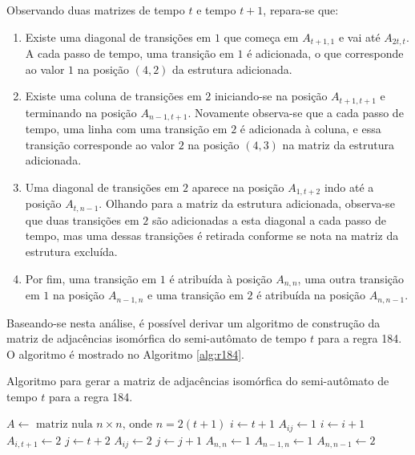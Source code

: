 \documentclass[12pt,a4paper]{article}
\begin{document}
Observando duas matrizes de tempo $t$ e tempo $t+1$, repara-se que:

\begin{enumerate}
\item Existe uma diagonal de transições em $1$ que começa em $A_{t+1,1}$
e vai até $A_{2t,t}$. A cada passo de tempo, uma transição em $1$ é adicionada,
o que corresponde ao valor $1$ na posição $(4,2)$ da estrutura adicionada.

\item Existe uma coluna de transições em $2$ iniciando-se na posição
$A_{t+1,t+1}$ e terminando na posição $A_{n-1,t+1}$. Novamente observa-se
que a cada passo de tempo, uma linha com uma transição em $2$ é adicionada à
coluna, e essa transição corresponde ao valor $2$ na posição $(4,3)$ na matriz da
estrutura adicionada.

\item Uma diagonal de transições em $2$ aparece na posição $A_{1,t+2}$ indo
até a posição $A_{t,n-1}$. Olhando para a matriz da estrutura adicionada,
observa-se que duas transições em $2$ são adicionadas a esta diagonal a cada
passo de tempo, mas uma dessas transições é retirada conforme se nota na
matriz da estrutura excluída.

\item Por fim, uma transição em $1$ é atribuída à posição $A_{n,n}$, uma
outra transição em $1$ na posição $A_{n-1,n}$ e uma transição em $2$ é
atribuída na posição $A_{n,n-1}$.
\end{enumerate}

Baseando-se nesta análise, é possível derivar um algoritmo de construção da
matriz de adjacências isomórfica do semi-autômato de tempo $t$ para a
regra 184. O algoritmo é mostrado no Algoritmo \ref{alg:r184}.

\begin{algorithm}
\caption{Algoritmo para gerar a matriz de adjacências isomórfica do
semi-autômato de tempo $t$ para a regra 184.}
\label{alg:r184}
\begin{algorithmic}
\STATE $A \leftarrow \mbox{ matriz nula } n \times n \mbox{, onde } n=2(t+1)$
\STATE $i \leftarrow t+1$
\STATE $A_{ij} \leftarrow 1$
\STATE $i \leftarrow i+1$
\ENDFOR
{}
\STATE $A_{i,t+1} \leftarrow 2$
\ENDFOR
\STATE $j \leftarrow t+2$
\STATE $A_{ij} \leftarrow 2$
\STATE $j \leftarrow j+1$
\ENDFOR
\STATE $A_{n,n} \leftarrow 1$
\STATE $A_{n-1,n} \leftarrow 1$
\STATE $A_{n,n-1} \leftarrow 2$
\end{algorithmic}
\end{algorithm}
\end{document}
